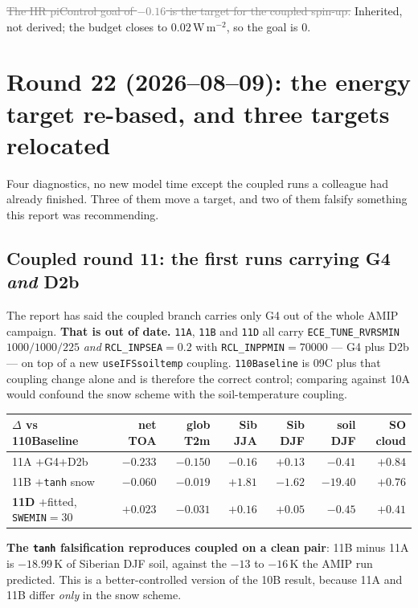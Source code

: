 \documentclass[10pt]{article}
\newcommand{\dead}[1]{\textcolor{gray}{\sout{#1}}}
\begin{document}
\dead{The HR piControl goal of $-0.16$ is the target for the coupled spin-up.} Inherited, not
derived; the budget closes to $0.02$\,W\,m$^{-2}$, so the goal is $0$.

\section{Round 22 (2026--08--09): the energy target re-based, and three targets
relocated}\label{sec:r22}
Four diagnostics, no new model time except the coupled runs a colleague had already
finished. Three of them move a target, and two of them falsify something this report
was recommending.

\subsection{Coupled round 11: the first runs carrying G4 \emph{and} D2b}\label{sub:r11coupled}
The report has said the coupled branch carries only G4 out of the whole AMIP campaign.
\textbf{That is out of date.} \texttt{11A}, \texttt{11B} and \texttt{11D} all carry
\texttt{ECE\_TUNE\_RVRSMIN} $1000/1000/225$ \emph{and} \texttt{RCL\_INPSEA}$=0.2$ with
\texttt{RCL\_INPPMIN}$=70000$ --- G4 plus D2b --- on top of a new \texttt{useIFSsoiltemp}
coupling. \texttt{110Baseline} is 09C plus that coupling change alone and is therefore the
correct control; comparing against 10A would confound the snow scheme with the
soil-temperature coupling.

\begin{center}\footnotesize
\begin{tabular}{l r r r r r r}
\toprule
$\Delta$ vs 110Baseline & net TOA & glob T2m & Sib JJA & Sib DJF & \textbf{soil DJF} & SO cloud \\
\midrule
11A $+$G4$+$D2b & $-0.233$ & $-0.150$ & $-0.16$ & $+0.13$ & $-0.41$ & $+0.84$ \\
11B $+$\texttt{tanh} snow & $-0.060$ & $-0.019$ & $+1.81$ & $-1.62$ & $\mathbf{-19.40}$ & $+0.76$ \\
\textbf{11D} $+$fitted, \texttt{SWEMIN}$=30$ & $+0.023$ & $-0.031$ & $+0.16$ & $+0.05$ & $\mathbf{-0.45}$ & $+0.41$ \\
\bottomrule
\end{tabular}
\end{center}

\noindent \textbf{The \texttt{tanh} falsification reproduces coupled on a clean pair}:
11B minus 11A is $-18.99$\,K of Siberian DJF soil, against the $-13$ to $-16$\,K the AMIP
run predicted. This is a better-controlled version of the 10B result, because 11A and 11B
differ \emph{only} in the snow scheme.
\end{document}
